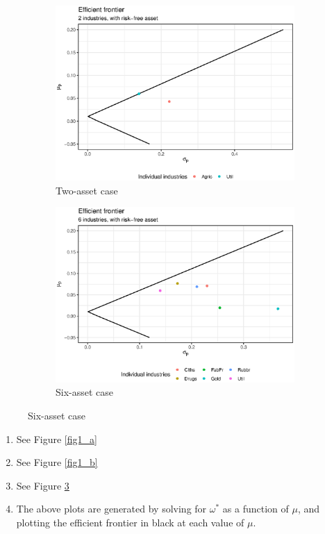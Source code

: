 \documentclass[11pt]{article}
\newcommand{\w}{\omega}
\begin{document}
\begin{enumerate}
	\begin{figure}[!hbtp]
		\caption{Efficient Frontiers, with Risk-Free Rate of 1\%}
		\begin{subfigure}{.5\textwidth}
			\centering
			\includegraphics[width=.8\linewidth]{plot_6c.eps}
			\caption{Two-asset case}
			\label{fig2_a}
		\end{subfigure}%
		\begin{subfigure}{.5\textwidth}
			\centering
			\includegraphics[width=.8\linewidth]{plot_6d}
			\caption{Six-asset case}
			\label{fig2_b}
		\end{subfigure}
		\label{fig2}
	\end{figure}
	
	\begin{enumerate}
		\item See Figure \ref{fig1_a}
		\item See Figure \ref{fig1_b}
		\item See Figure \ref{fig2}
		\newpage
		\item The above plots are generated by solving for $ \w^* $ as a function of $ \mu $, and plotting the efficient frontier in black at each value of $\mu$. 
		

\end{enumerate}
\end{enumerate}
\end{document}

